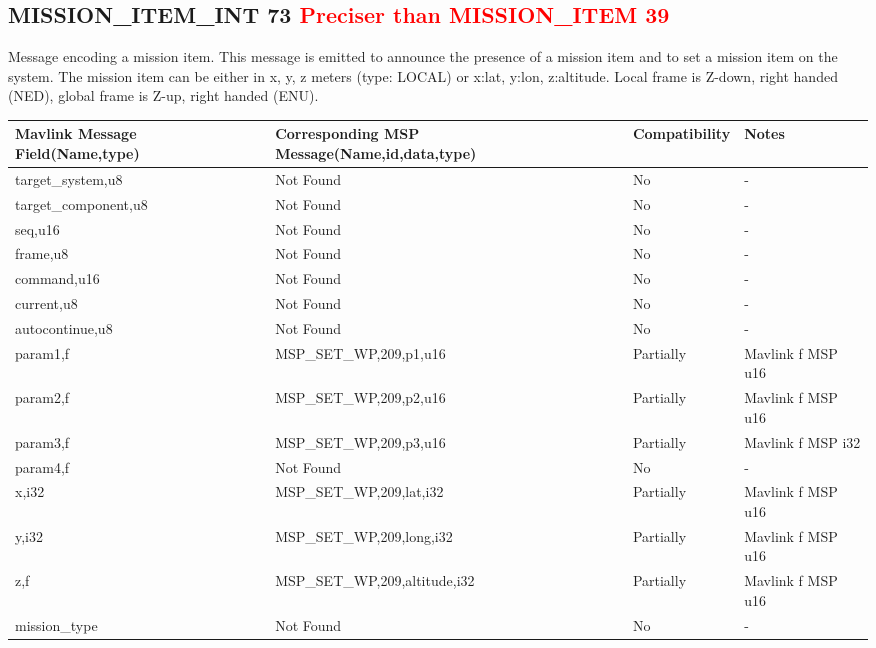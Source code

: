 \cleardoublepage



\subsection{MISSION\_ITEM\_INT 73 \textcolor{red}{Preciser than MISSION\_ITEM 39 } } 
Message encoding a mission item. This message is emitted to announce the presence of a mission item and to set a mission item on the system. The mission item can be either in x, y, z meters (type: LOCAL) or x:lat, y:lon, z:altitude. Local frame is Z-down, right handed (NED), global frame is Z-up, right handed (ENU).\\

{
\centering
\begin{tabular}{ |p{4cm  } |p{7cm} | p{2cm}|m{5em}|}
\hline
Mavlink Message Field(Name,type)&Corresponding MSP Message(Name,id,data,type)& Compatibility & Notes\\
\hline
target\_system,u8 & Not Found & No & - \\
\hline
target\_component,u8 & Not Found & No & - \\
\hline
seq,u16 & Not Found & No & - \\
\hline
frame,u8 & Not Found & No & - \\
\hline
command,u16 & Not Found & No & - \\
\hline
current,u8 & Not Found & No & - \\
\hline
autocontinue,u8 & Not Found & No & - \\
\hline
\rowcolor{lightgray}
param1,f & MSP\_SET\_WP,209,p1,u16& Partially & Mavlink f MSP u16 \\
\hline
\rowcolor{lightgray}
param2,f & MSP\_SET\_WP,209,p2,u16& Partially & Mavlink f MSP u16 \\
\hline
\rowcolor{lightgray}
param3,f & MSP\_SET\_WP,209,p3,u16& Partially & Mavlink f MSP i32 \\
\hline
param4,f & Not Found & No & - \\
\hline
\rowcolor{lightgray}
x,i32 & MSP\_SET\_WP,209,lat,i32& Partially & Mavlink f MSP u16 \\
\hline
\rowcolor{lightgray}
y,i32 & MSP\_SET\_WP,209,long,i32& Partially & Mavlink f MSP u16 \\
\hline
\rowcolor{lightgray}
z,f & MSP\_SET\_WP,209,altitude,i32& Partially & Mavlink f MSP u16 \\
\hline
mission\_type &  Not Found & No & - \\

\end{tabular}
}

\cleardoublepage




